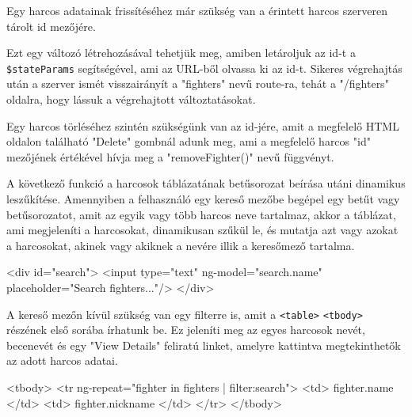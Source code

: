 Egy harcos adatainak frissítéséhez már szükség van a érintett harcos szerveren tárolt id mezőjére.


Ezt egy változó létrehozásával tehetjük meg, amiben letároljuk az id-t a\\ 
\texttt{\$stateParams} segítségével, ami az URL-ből olvassa ki az id-t. Sikeres végrehajtás után a szerver ismét visszairányít a "fighters" nevű route-ra, tehát a "/fighters" oldalra, hogy lássuk a végrehajtott változtatásokat.

Egy harcos törléséhez szintén szükségünk van az id-jére, amit a megfelelő HTML oldalon található "Delete" gombnál adunk meg, ami a megfelelő harcos "id" mezőjének értékével hívja meg a "removeFighter()" nevű függvényt.


A következő funkció a harcosok táblázatának betűsorozat beírása utáni dinamikus leszűkítése. Amennyiben a felhasználó egy kereső mezőbe begépel egy betűt vagy betűsorozatot, amit az egyik vagy több harcos neve tartalmaz, akkor a táblázat, ami megjeleníti a harcosokat, dinamikusan szűkül le, és mutatja azt vagy azokat a harcosokat, akinek vagy akiknek a nevére illik a keresőmező tartalma.

\begin{cpp}
<div id="search">
  <input type="text" ng-model="search.name" 
  placeholder="Search fighters..."/>
</div>
\end{cpp}

A kereső mezőn kívül szükség van egy filterre is, amit a \texttt{<table>} \texttt{<tbody>} részének első sorába írhatunk be. Ez jeleníti meg az egyes harcosok nevét, becenevét és egy "View Details" feliratú linket, amelyre kattintva megtekinthetők az adott harcos adatai.

\begin{cpp}
<tbody>
	<tr ng-repeat="fighter in fighters | filter:search">
		<td>{{ fighter.name }}</td>
        <td>{{ fighter.nickname }}</td>
	</tr>
</tbody>
\end{cpp}

